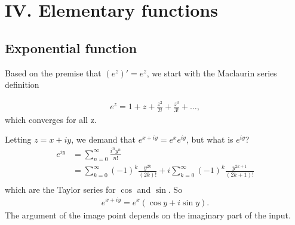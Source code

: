 \documentclass[12pt]{article}
\begin{document}
\section*{IV. Elementary functions}

\subsection*{Exponential function}

Based on the premise that $(e^z)' = e^z$, we start with the Maclaurin series definition

\begin{align*}
  e^z = 1 + z + \frac{z^2}{2!} + \frac{z^3}{3!} + \ldots,
\end{align*}
which converges for all z.

Letting $z = x + iy$, we demand that $e^{x + iy} = e^xe^{iy}$, but what is $e^{iy}$?
\begin{align*}
  e^{iy}
  &= \sum_{n=0}^\infty \frac{i^ny^n}{n!} \\
  &= \sum_{k=0}^\infty (-1)^{k}\frac{y^{2k}}{(2k)!} +
     i\sum_{k=0}^\infty (-1)^{k}\frac{y^{2k + 1}}{(2k + 1)!}\\
\end{align*}
which are the Taylor series for $\cos$ and $\sin$. So
\begin{align*}
  e^{x + iy} = e^x(\cos y + i\sin y).
\end{align*}
The argument of the image point depends on the imaginary part of the input.


\end{document}
